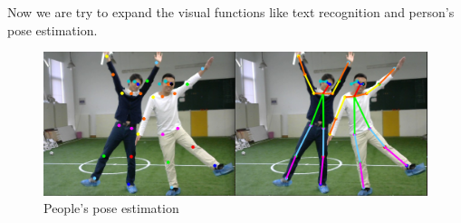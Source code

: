 Now we are try to expand the visual functions like text recognition and person's pose estimation.
\begin{figure}[h!]
    \centering
    \includegraphics[width=1.\textwidth]{figs/vision2.png}
    \caption{People's pose estimation}
    \label{fig:vision1}
    \end{figure}